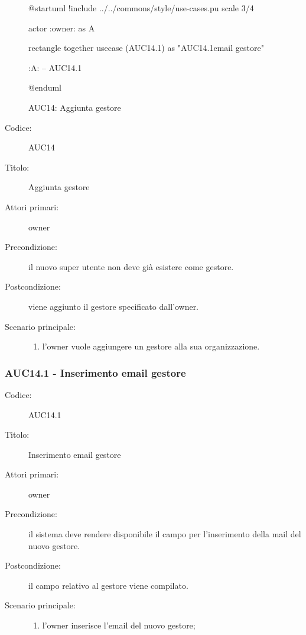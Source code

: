 \documentclass[../../../analisi-dei-requisiti.tex]{subfiles}
\begin{document}
\begin{figure}[h!]
  \centering
  \begin{plantuml}
  @startuml
  !include ../../commons/style/use-cases.pu
  scale 3/4

  actor :owner: as A

  rectangle {
    together {
      usecase (AUC14.1) as "AUC14.1\nInserimento email gestore"
    }
  }

  :A: -- AUC14.1

  @enduml
  \end{plantuml}
  \caption{AUC14: Aggiunta gestore}
  \label{fig:auc14}
\end{figure}

\begin{description}
  \item[Codice:] AUC14
  \item[Titolo:] Aggiunta gestore
  \item[Attori primari:] owner
  \item[Precondizione:] il nuovo super utente non deve già esistere come gestore.
  \item[Postcondizione:] viene aggiunto il gestore specificato dall'owner.
  \item[Scenario principale:]
  \begin{enumerate}
    \item l'owner vuole aggiungere un gestore alla sua organizzazione.
  \end{enumerate}
\end{description}

\subsubsection{AUC14.1 - Inserimento email gestore}%
\label{subs:AUC14.1}
\begin{description}
  \item[Codice:] AUC14.1
  \item[Titolo:] Inserimento email gestore
  \item[Attori primari:] owner
  \item[Precondizione:] il sistema deve rendere disponibile il campo per l'inserimento della mail del nuovo gestore.
  \item[Postcondizione:] il campo relativo al gestore viene compilato.
  \item[Scenario principale:]
  \begin{enumerate}
    \item l'owner inserisce l'email del nuovo gestore;
  \end{enumerate}
\end{description}
\end{document}

